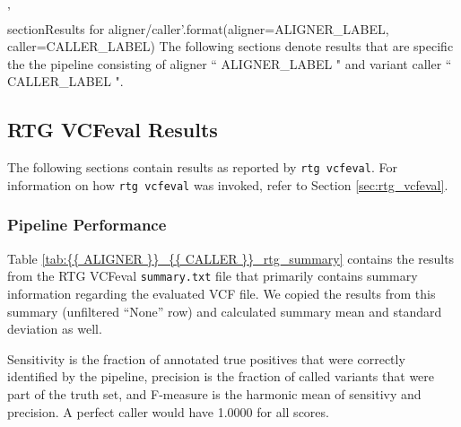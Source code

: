 {{ '\\section{{Results for {aligner}/{caller}}}'.format(aligner=ALIGNER_LABEL, caller=CALLER_LABEL) }}
The following sections denote results that are specific the the pipeline consisting of aligner ``{{ ALIGNER_LABEL }}" and variant caller ``{{ CALLER_LABEL }}".

\subsection{RTG VCFeval Results}
The following sections contain results as reported by \texttt{rtg vcfeval}. For information on how \texttt{rtg vcfeval} was invoked, refer to Section \ref{sec:rtg_vcfeval}.

\subsubsection{Pipeline Performance}
Table \ref{tab:{{ ALIGNER }}_{{ CALLER }}_rtg_summary} contains the results from the RTG VCFeval \texttt{summary.txt} file that primarily contains summary information regarding the evaluated VCF file. We copied the results from this summary (unfiltered ``None'' row) and calculated summary mean and standard deviation as well.

Sensitivity is the fraction of annotated true positives that were correctly identified by the pipeline, precision is the fraction of called variants that were part of the truth set, and F-measure is the harmonic mean of sensitivy and precision. A perfect caller would have 1.0000 for all scores.

